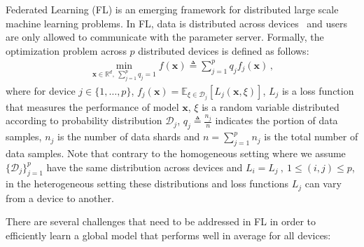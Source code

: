 \documentclass[sigconf, anonymous, review]{acmart}
\begin{document}
Federated Learning (FL) is an emerging framework for distributed large scale machine learning problems.
In FL, data is distributed across devices~\citep{konevcny2016federated,mcmahan2016communication} and users are only allowed to communicate with the parameter server.
Formally, the optimization problem across $p$ distributed devices is defined as follows:
\begin{align}\label{eq:main}
   \min_{\boldsymbol{x}\in \mathbb{R}^{d},\: \sum_{j=1}^pq_j=1} f(\boldsymbol{x})\triangleq \sum_{j=1}^{p}q_jf_j(\boldsymbol{x}) \, , 
\end{align}
where for device $j\in \{1,\ldots,p\}$, $f_j(\boldsymbol{x})=\mathbb{E}_{\xi\in\mathcal{D}_j}\left[L_j\left(\boldsymbol{x},\xi\right)\right]$, $L_j$ is a loss function that measures the performance of model $\boldsymbol{x}$, $\xi$ is a random variable distributed according to probability distribution $\mathcal{D}_j$, $q_j\triangleq\frac{n_j}{n}$ indicates the portion of data samples, $n_j$ is the number of data shards and $n=\sum_{j=1}^pn_j$ is the total number of data samples. Note that contrary to the homogeneous setting where we assume $\{\mathcal{D}_j\}_{j=1}^p$ have the same distribution across devices and $L_i=L_j \ , \ 1 \leq (i,j) \leq p$, in the heterogeneous setting these distributions and loss functions $L_j$ can vary from a device to another. 


There are several challenges that need to be addressed in FL in order to efficiently learn a global model that performs well in average for all devices:
\end{document}
